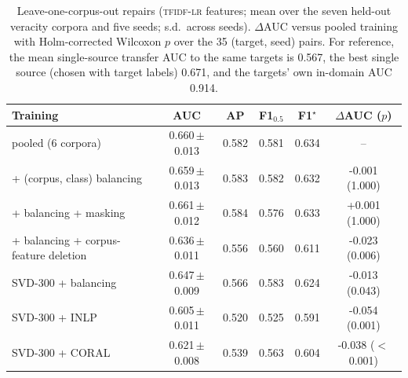 \begin{table}[t]
\centering
\caption{Leave-one-corpus-out repairs (\textsc{tfidf-lr} features; mean over the seven held-out veracity corpora and five seeds; s.d.\ across seeds). $\Delta$AUC versus pooled training with Holm-corrected Wilcoxon $p$ over the 35 (target, seed) pairs. For reference, the mean single-source transfer AUC to the same targets is 0.567, the best single source (chosen with target labels) 0.671, and the targets' own in-domain AUC 0.914.}\label{tab:repair}
\small
\begin{tabular}{@{}lccccc@{}}
\toprule
Training & AUC & AP & F1$_{0.5}$ & F1$^\star$ & $\Delta$AUC ($p$) \\
\midrule
pooled (6 corpora) & 0.660\,{\scriptsize$\pm$0.013} & 0.582 & 0.581 & 0.634 & -- \\
+ (corpus, class) balancing & 0.659\,{\scriptsize$\pm$0.013} & 0.583 & 0.582 & 0.632 & -0.001 (1.000) \\
+ balancing + masking & 0.661\,{\scriptsize$\pm$0.012} & 0.584 & 0.576 & 0.633 & +0.001 (1.000) \\
+ balancing + corpus-feature deletion & 0.636\,{\scriptsize$\pm$0.011} & 0.556 & 0.560 & 0.611 & -0.023 (0.006) \\
SVD-300 + balancing & 0.647\,{\scriptsize$\pm$0.009} & 0.566 & 0.583 & 0.624 & -0.013 (0.043) \\
SVD-300 + INLP & 0.605\,{\scriptsize$\pm$0.011} & 0.520 & 0.525 & 0.591 & -0.054 (0.001) \\
SVD-300 + CORAL & 0.621\,{\scriptsize$\pm$0.008} & 0.539 & 0.563 & 0.604 & -0.038 ($<$0.001) \\
\bottomrule
\end{tabular}
\end{table}
